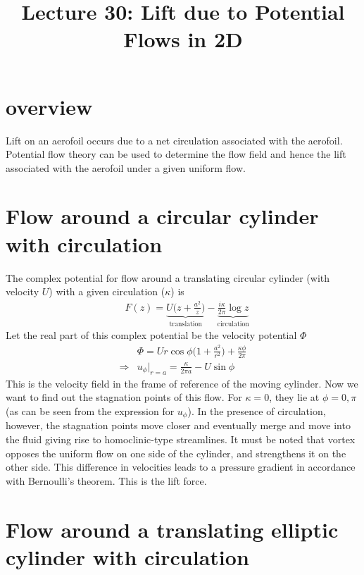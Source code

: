 \documentclass[11pt,a4paper]{article}
\title{Lecture 30: Lift due to Potential Flows in 2D}
\date{\displaydate{date}}
\author{}
\newcommand{\describe}[2]{\underbrace{#2}_{\text{#1}}}%
\newcommand{\1}{\vect{1}}
\newcommand{\RA}{\Rightarrow}
\begin{document}
\maketitle

\section*{overview}
Lift on an aerofoil occurs due to a net circulation associated with the aerofoil. Potential flow theory can be used to determine the flow field and hence the lift associated with the aerofoil under a given uniform flow.

\section{Flow around a circular cylinder with circulation}

The complex potential for flow around a translating circular cylinder (with velocity $U$) with a given circulation ($\kappa$) is 
\begin{align*}
&F(z) = \describe{translation}{U\bigg( z + \frac{a^2}{z}\bigg)} - \describe{circulation}{\frac{i\kappa}{2\pi}\log z}
\end{align*}
Let the real part of this complex potential be the velocity potential $\Phi$
\begin{align*}
&\Phi  = Ur\cos\phi\bigg(1+\frac{a^2}{r^2} \bigg) + \frac{\kappa \phi}{2\pi}\\
\RA& u_\phi\Big|_{r=a} = \frac{\kappa}{2\pi a} - U \sin\phi
\end{align*}
This is the velocity field in the frame of reference of the moving cylinder. Now we want to find out the stagnation points of this flow. For $\kappa = 0$, they lie at $\phi = 0, \pi$ (as can be seen from the expression for $u_\phi$). In the presence of circulation, however, the stagnation points move closer and eventually merge and move into the fluid giving rise to homoclinic-type streamlines. It must be noted that vortex opposes the uniform flow on one side of the cylinder, and strengthens it on the other side. This difference in velocities leads to a pressure gradient in accordance with Bernoulli's theorem. This is the lift force. 

\section{Flow around a translating elliptic cylinder with circulation}
\end{document}
